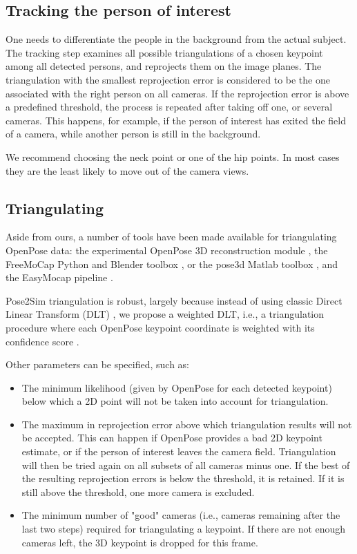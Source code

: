 \subsection{Tracking the person of interest}

One needs to differentiate the people in the background from the actual subject. The tracking step examines all possible triangulations of a chosen keypoint among all detected persons, and reprojects them on the image planes. The triangulation with the smallest reprojection error is considered to be the one associated with the right person on all cameras. If the reprojection error is above a predefined threshold, the process is repeated after taking off one, or several cameras. This happens, for example, if the person of interest has exited the field of a camera, while another person is still in the background.

We recommend choosing the neck point or one of the hip points. In most cases they are the least likely to move out of the camera views.


\subsection{Triangulating}

Aside from ours, a number of tools have been made available for triangulating OpenPose data: the experimental OpenPose 3D reconstruction module \cite{Hidalgo2021}, the FreeMoCap Python and Blender toolbox \cite{Matthis2022}, or the pose3d Matlab toolbox \cite{Sheshadri2020}, and the EasyMocap pipeline \cite{Easymocap2021}. 

Pose2Sim triangulation is robust, largely because instead of using classic Direct Linear Transform (DLT) \cite{Hartley1997}, we propose a weighted DLT, i.e., a triangulation procedure where each OpenPose keypoint coordinate is weighted with its confidence score \cite{Pagnon2021}.

Other parameters can be specified, such as:
\begin{itemize}[itemsep=0em, topsep=0em, leftmargin=*]
      \item The minimum likelihood (given by OpenPose for each detected keypoint) below which a 2D point will not be taken into account for triangulation.
      \item The maximum in reprojection error above which triangulation results will not be accepted. This can happen if OpenPose provides a bad 2D keypoint estimate, or if the person of interest leaves the camera field. Triangulation will then be tried again on all subsets of all cameras minus one. If the best of the resulting reprojection errors is below the threshold, it is retained. If it is still above the threshold, one more camera is excluded.
      \item The minimum number of "good" cameras (i.e., cameras remaining after the last two steps) required for triangulating a keypoint. If there are not enough cameras left, the 3D keypoint is dropped for this frame.
\end{itemize}

